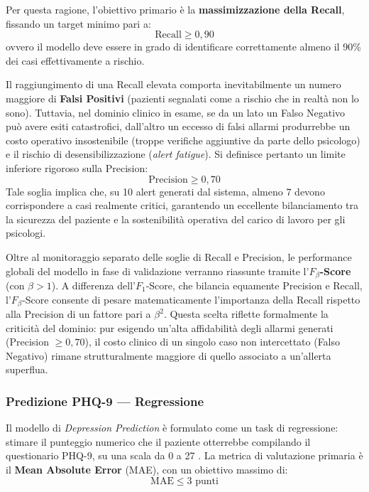 Per questa ragione, l'obiettivo primario è la \textbf{massimizzazione della Recall}, fissando un target minimo pari a:
\[
    \text{Recall} \geq 0{,}90
\]
ovvero il modello deve essere in grado di identificare correttamente almeno il 90\% dei casi effettivamente a rischio.

Il raggiungimento di una Recall elevata comporta inevitabilmente un numero maggiore di \textbf{Falsi Positivi} (pazienti segnalati come a rischio che in realtà non lo sono). Tuttavia, nel dominio clinico in esame, se da un lato un Falso Negativo può avere esiti catastrofici, dall'altro un eccesso di falsi allarmi produrrebbe un costo operativo insostenibile (troppe verifiche aggiuntive da parte dello psicologo) e il rischio di desensibilizzazione (\textit{alert fatigue}). Si definisce pertanto un limite inferiore rigoroso sulla Precision:
\[
    \text{Precision} \geq 0{,}70
\]
Tale soglia implica che, su 10 alert generati dal sistema, almeno 7 devono corrispondere a casi realmente critici, garantendo un eccellente bilanciamento tra la sicurezza del paziente e la sostenibilità operativa del carico di lavoro per gli psicologi.

Oltre al monitoraggio separato delle soglie di Recall e Precision, le performance globali del modello in fase di validazione verranno riassunte tramite l'$F_{\beta}$\textbf{-Score} (con $\beta > 1$). A differenza dell'$F_{1}$-Score, che bilancia equamente Precision e Recall, l'$F_{\beta}$-Score consente di pesare matematicamente l'importanza della Recall rispetto alla Precision di un fattore pari a $\beta^{2}$. Questa scelta riflette formalmente la criticità del dominio: pur esigendo un'alta affidabilità degli allarmi generati (Precision $\geq 0{,}70$), il costo clinico di un singolo caso non intercettato (Falso Negativo) rimane strutturalmente maggiore di quello associato a un'allerta superflua.

\subsubsection{Predizione PHQ-9 --- Regressione}
\label{subsubsec:metriche_phq9}

Il modello di \textit{Depression Prediction} è formulato come un task di regressione: stimare il punteggio numerico che il paziente otterrebbe compilando il questionario PHQ-9, su una scala da 0 a 27 \cite{kroenke2001phq9}. La metrica di valutazione primaria è il \textbf{Mean Absolute Error} (MAE), con un obiettivo massimo di:
\[
    \text{MAE} \leq 3 \text{ punti}
\]


